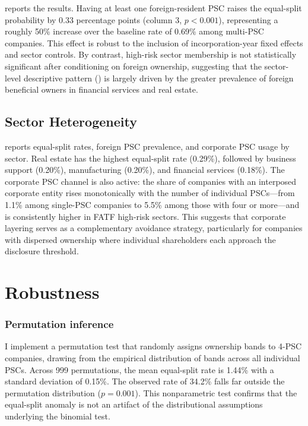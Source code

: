 \documentclass[12pt]{article}
\begin{document}
 reports the results. Having at least one foreign-resident PSC raises the equal-split probability by 0.33 percentage points (column 3, $p < 0.001$), representing a roughly 50\% increase over the baseline rate of 0.69\% among multi-PSC companies. This effect is robust to the inclusion of incorporation-year fixed effects and sector controls. By contrast, high-risk sector membership is not statistically significant after conditioning on foreign ownership, suggesting that the sector-level descriptive pattern () is largely driven by the greater prevalence of foreign beneficial owners in financial services and real estate.



\subsection{Sector Heterogeneity}

 reports equal-split rates, foreign PSC prevalence, and corporate PSC usage by sector. Real estate has the highest equal-split rate (0.29\%), followed by business support (0.20\%), manufacturing (0.20\%), and financial services (0.18\%). The corporate PSC channel is also active: the share of companies with an interposed corporate entity rises monotonically with the number of individual PSCs---from 1.1\% among single-PSC companies to 5.5\% among those with four or more---and is consistently higher in FATF high-risk sectors. This suggests that corporate layering serves as a complementary avoidance strategy, particularly for companies with dispersed ownership where individual shareholders each approach the disclosure threshold.




\section{Robustness}
\label{sec:robustness}

\subsubsection*{Permutation inference} I implement a permutation test that randomly assigns ownership bands to 4-PSC companies, drawing from the empirical distribution of bands across all individual PSCs. Across 999 permutations, the mean equal-split rate is 1.44\% with a standard deviation of 0.15\%. The observed rate of 34.2\% falls far outside the permutation distribution ($p = 0.001$). This nonparametric test confirms that the equal-split anomaly is not an artifact of the distributional assumptions underlying the binomial test.
\end{document}

